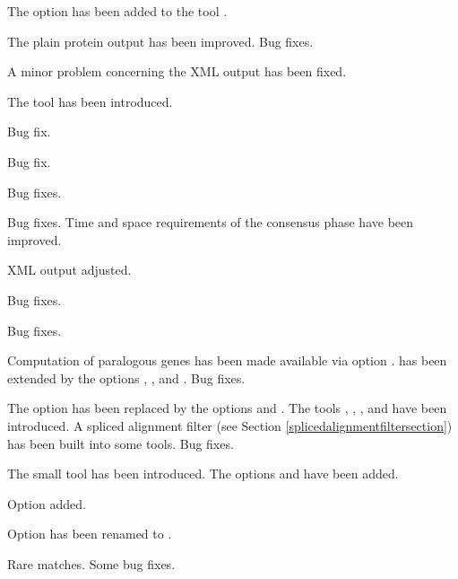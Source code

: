 \documentclass[11pt,a4paper,titlepage]{article}
\begin{document}
The option  has been added to the tool \Callgthbssmbuild.

 The plain protein output has been improved. Bug fixes.

 A minor problem concerning the XML output has been fixed.

 The tool \Callgthbssmbuild has been introduced.

 Bug fix.

 Bug fix.

 Bug fixes.

 Bug fixes. Time and space requirements of the consensus phase have been improved.

 XML output adjusted.

 Bug fixes.

 Bug fixes.

Computation of paralogous genes has been made available via option
.  \Callgthgetseq has been extended by the options
, , and
. Bug fixes.

The option  has been replaced by the options  and
. The tools \Callgthsplit, \Callgthsplittwodim,
\Callgthgetseq, and \Callgthfilestat have been introduced. A spliced
alignment filter (see Section \ref{splicedalignmentfiltersection}) has been built into some \Gth tools. Bug fixes.

 The small tool \Callgthbssmfileinfo has been introduced. The options  and  have been added. 

 Option  added.

 Option  has been renamed to .

 Rare matches. Some bug fixes.
\end{document}
